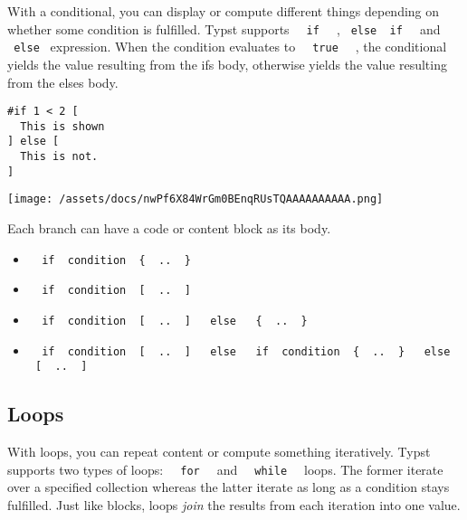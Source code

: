 With a conditional, you can display or compute different things
depending on whether some condition is fulfilled. Typst supports
\texttt{\ }{\texttt{\ if\ }}\texttt{\ } ,
\texttt{\ else\ }{\texttt{\ if\ }}\texttt{\ } and \texttt{\ else\ }
expression. When the condition evaluates to
\texttt{\ }{\texttt{\ true\ }}\texttt{\ } , the conditional yields the
value resulting from the if\textquotesingle s body, otherwise yields the
value resulting from the else\textquotesingle s body.

\begin{verbatim}
#if 1 < 2 [
  This is shown
] else [
  This is not.
]
\end{verbatim}

\texttt{[image: /assets/docs/nwPf6X84WrGm0BEnqRUsTQAAAAAAAAAA.png]}

Each branch can have a code or content block as its body.

\begin{itemize}
\tightlist
\item
  \texttt{\ }{\texttt{\ if\ }}\texttt{\ condition\ }{\texttt{\ \{\ }}\texttt{\ ..\ }{\texttt{\ \}\ }}\texttt{\ }
\item
  \texttt{\ }{\texttt{\ if\ }}\texttt{\ condition\ }{\texttt{\ {[}\ }}\texttt{\ ..\ }{\texttt{\ {]}\ }}\texttt{\ }
\item
  \texttt{\ }{\texttt{\ if\ }}\texttt{\ condition\ }{\texttt{\ {[}\ }}\texttt{\ ..\ }{\texttt{\ {]}\ }}\texttt{\ }{\texttt{\ else\ }}\texttt{\ }{\texttt{\ \{\ }}\texttt{\ ..\ }{\texttt{\ \}\ }}\texttt{\ }
\item
  \texttt{\ }{\texttt{\ if\ }}\texttt{\ condition\ }{\texttt{\ {[}\ }}\texttt{\ ..\ }{\texttt{\ {]}\ }}\texttt{\ }{\texttt{\ else\ }}\texttt{\ }{\texttt{\ if\ }}\texttt{\ condition\ }{\texttt{\ \{\ }}\texttt{\ ..\ }{\texttt{\ \}\ }}\texttt{\ }{\texttt{\ else\ }}\texttt{\ }{\texttt{\ {[}\ }}\texttt{\ ..\ }{\texttt{\ {]}\ }}\texttt{\ }
\end{itemize}

\subsection{Loops}\label{loops}

With loops, you can repeat content or compute something iteratively.
Typst supports two types of loops:
\texttt{\ }{\texttt{\ for\ }}\texttt{\ } and
\texttt{\ }{\texttt{\ while\ }}\texttt{\ } loops. The former iterate
over a specified collection whereas the latter iterate as long as a
condition stays fulfilled. Just like blocks, loops \emph{join} the
results from each iteration into one value.

